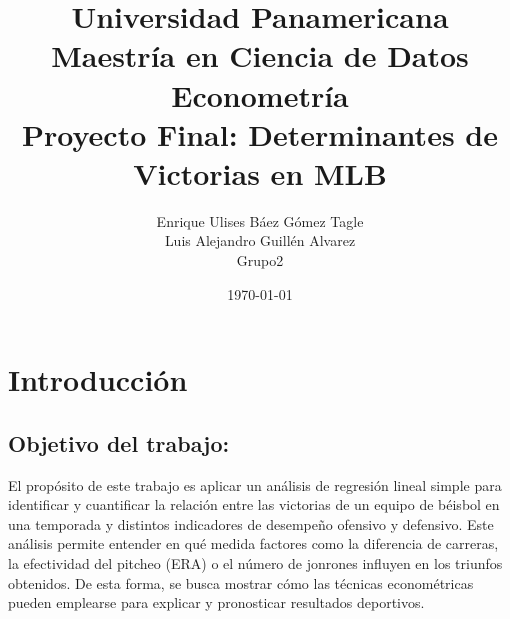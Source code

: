 \documentclass[10pt]{article}
\title{Universidad Panamericana \\ Maestría en Ciencia de Datos 
\\ Econometría \\ \vspace{0.5cm} 
Proyecto Final: Determinantes de Victorias en MLB
}
\author{Enrique Ulises Báez Gómez Tagle\\Luis Alejandro Guillén Alvarez\\Grupo2}
\date{\today}
\begin{document}
\maketitle

\tableofcontents

\newpage
\section{Introducción}
\subsection{Objetivo del trabajo:}
El propósito de este trabajo es aplicar un análisis de regresión lineal simple para identificar y cuantificar la relación entre las victorias de un equipo de béisbol en una temporada y distintos indicadores de desempeño ofensivo y defensivo. Este análisis permite entender en qué medida factores como la diferencia de carreras, la efectividad del pitcheo (ERA) o el número de jonrones influyen en los triunfos obtenidos. De esta forma, se busca mostrar cómo las técnicas econométricas pueden emplearse para explicar y pronosticar resultados deportivos.
\end{document}
